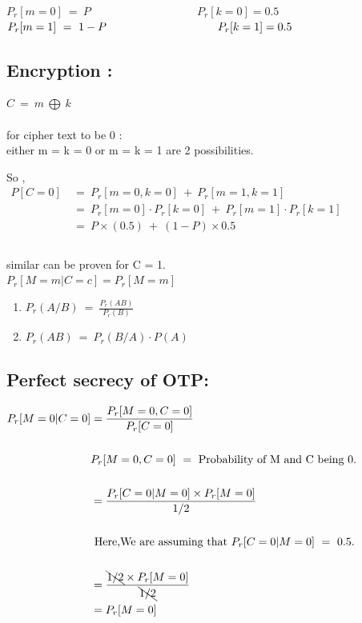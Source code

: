 \documentclass[11pt]{article}
\begin{document}
$P_r[m=0]\ =\ P\hspace{4cm} P_r[k=0]=0.5 $\\

$P_r[m=1]\ =\ 1-P\hspace{3.5cm} P_r[k=1]=0.5 $\\

\newpage
\subsection{Encryption :}
$C\ =\ m\ \bigoplus\ k$\\\\
for cipher text to be 0 :\\
either m = k = 0 or m = k = 1 are 2 possibilities.

So ,\\  
$\begin{aligned}
P[C=0]\ &= \ P_r[m=0,k=0]\ +\ P_r[m=1,k=1]\\
 &=\ P_r[m=0]\cdot P_r[k=0]\ +\ P_r[m=1]\cdot P_r[k=1]\\
 &=\ P\times(0.5)\ +\ (1-P)\times0.5 \\\\
\end{aligned}$
 
 similar can be proven for C = 1.\\
 
 $P_r[M=m|C=c] = P_r[M=m]$\\
\begin{enumerate}
    \item $P_r(A/B)\ =\ \frac{P_r(AB)}{P_r(B)}$
    \item $P_r(AB)\ =\ P_r(B/A) \cdot P(A) $ \\
\end{enumerate}

\subsection{Perfect secrecy of OTP:}
$\begin{aligned}
P_r[M=0 | C=0] & = \frac{P_r[M=0,C=0]}{P_r[C=0]} \hspace{2.5cm} \\\\
& P_r[M=0,C=0]\ =\ \text{Probability of M and C being 0.} \\\\
& = \frac{P_r[C=0|M=0] \times P_r[M=0]}{1/2} \\\\
& \text{ Here,We are assuming that } P_r[C=0|M=0]\ =\  \text{0.5.} \\\\
& = \frac{ \bcancel{1/2} \times P_r[M=0]}{ \bcancel{1/2}}\\
& = P_r[M=0]\\\\
\end{aligned}$
\end{document}
